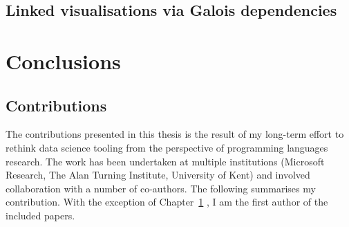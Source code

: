 \documentclass[fleqn,11pt]{report}
\theoremstyle{definition}
\begin{document}
\chapter{Linked visualisations via Galois dependencies}
\label{ch:galois}



\part{Conclusions}

\chapter*{Contributions}
\label{ch:contribs}

The contributions presented in this thesis is the result of my long-term effort to
rethink data science tooling from the perspective of programming languages research.
The work has been undertaken at multiple institutions (Microsoft Research, The Alan
Turning Institute, University of Kent) and involved collaboration with a number of
co-authors. The following summarises my contribution. With the exception of
Chapter~\ref{ch:galois} \citep{petricek-2022-galois},
I am the first author of the included papers.
\end{document}
